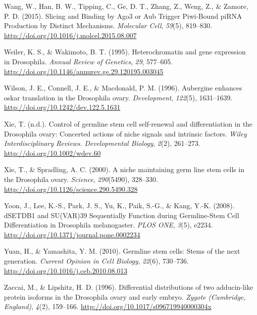 \documentclass[12pt,oneside]{reedthesis}
\begin{document}
\leavevmode\hypertarget{ref-wangSlicingBindingAgo32015}{}%
Wang, W., Han, B. W., Tipping, C., Ge, D. T., Zhang, Z., Weng, Z., \& Zamore, P. D. (2015). Slicing and Binding by Ago3 or Aub Trigger Piwi-Bound piRNA Production by Distinct Mechanisms. \emph{Molecular Cell}, \emph{59}(5), 819--830. \url{http://doi.org/10.1016/j.molcel.2015.08.007}

\leavevmode\hypertarget{ref-weilerHeterochromatinGeneExpression1995}{}%
Weiler, K. S., \& Wakimoto, B. T. (1995). Heterochromatin and gene expression in Drosophila. \emph{Annual Review of Genetics}, \emph{29}, 577--605. \url{http://doi.org/10.1146/annurev.ge.29.120195.003045}

\leavevmode\hypertarget{ref-wilsonAubergineEnhancesOskar1996}{}%
Wilson, J. E., Connell, J. E., \& Macdonald, P. M. (1996). Aubergine enhances oskar translation in the Drosophila ovary. \emph{Development}, \emph{122}(5), 1631--1639. \url{http://doi.org/10.1242/dev.122.5.1631}

\leavevmode\hypertarget{ref-xieControlGermlineStem2013a}{}%
Xie, T. (n.d.). Control of germline stem cell self-renewal and differentiation in the Drosophila ovary: Concerted actions of niche signals and intrinsic factors. \emph{Wiley Interdisciplinary Reviews. Developmental Biology}, \emph{2}(2), 261--273. \url{http://doi.org/10.1002/wdev.60}

\leavevmode\hypertarget{ref-xieNicheMaintainingGerm2000}{}%
Xie, T., \& Spradling, A. C. (2000). A niche maintaining germ line stem cells in the Drosophila ovary. \emph{Science}, \emph{290}(5490), 328--330. \url{http://doi.org/10.1126/science.290.5490.328}

\leavevmode\hypertarget{ref-yoonDSETDB1SUVAR2008}{}%
Yoon, J., Lee, K.-S., Park, J. S., Yu, K., Paik, S.-G., \& Kang, Y.-K. (2008). dSETDB1 and SU(VAR)39 Sequentially Function during Germline-Stem Cell Differentiation in Drosophila melanogaster. \emph{PLOS ONE}, \emph{3}(5), e2234. \url{http://doi.org/10.1371/journal.pone.0002234}

\leavevmode\hypertarget{ref-yuanGermlineStemCells2010}{}%
Yuan, H., \& Yamashita, Y. M. (2010). Germline stem cells: Stems of the next generation. \emph{Current Opinion in Cell Biology}, \emph{22}(6), 730--736. \url{http://doi.org/10.1016/j.ceb.2010.08.013}

\leavevmode\hypertarget{ref-zaccaiDifferentialDistributionsTwo1996}{}%
Zaccai, M., \& Lipshitz, H. D. (1996). Differential distributions of two adducin-like protein isoforms in the Drosophila ovary and early embryo. \emph{Zygote (Cambridge, England)}, \emph{4}(2), 159--166. \url{http://doi.org/10.1017/s096719940000304x}


\end{document}
